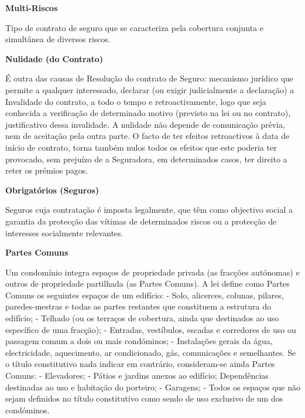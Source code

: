\begin{description}
\item \textbf{Multi-Riscos}

Tipo de contrato de seguro que se caracteriza pela cobertura conjunta e simultânea de diversos riscos.
\end{description}

\begin{description}
\item \textbf{Nulidade (do Contrato)}

É outra das causas de Resolução do contrato de Seguro: mecanismo jurídico que permite a qualquer interessado, declarar (ou exigir judicialmente a declaração) a Invalidade do contrato, a todo o tempo e retroactivamente, logo que seja conhecida a verificação de determinado motivo (previsto na lei ou no contrato), justificativo dessa invalidade. A nulidade não depende de comunicação prévia, nem de aceitação pela outra parte. O facto de ter efeitos retroactivos à data de início de contrato, torna também nulos todos os efeitos que este poderia ter provocado, sem prejuízo de a Seguradora, em determinados casos, ter direito a reter os prémios pagos.
\end{description}

\begin{description}
\item \textbf{Obrigatórios (Seguros)}

Seguros cuja contratação é imposta legalmente, que têm como objectivo social a garantia da protecção das vítimas de determinados riscos ou a protecção de interesses socialmente relevantes.
\end{description}

\begin{description}
\item \textbf{Partes Comuns}

Um condomínio integra espaços de propriedade privada (as fracções autónomas) e outros de propriedade partilhada (as Partes Comuns). A lei define como Partes Comuns os seguintes espaços de um edifício: - Solo, alicerces, colunas, pilares, paredes-mestras e todas as partes restantes que constituem a estrutura do edifício; - Telhado (ou os terraços de cobertura, ainda que destinados ao uso específico de uma fracção); - Entradas, vestíbulos, escadas e corredores de uso ou passagem comum a dois ou mais condóminos; - Instalações gerais da água, electricidade, aquecimento, ar condicionado, gás, comunicações e semelhantes. Se o título constitutivo nada indicar em contrário, consideram-se ainda Partes Comuns: - Elevadores; - Pátios e jardins anexos ao edifício;  Dependências destinadas ao uso e habitação do porteiro; - Garagens; - Todos os espaços que não sejam definidos no título constitutivo como sendo de uso exclusivo de um dos condóminos.
\end{description}

